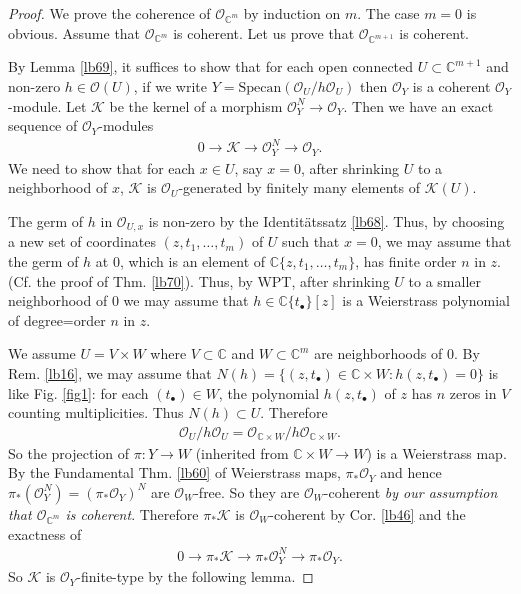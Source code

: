 \documentclass[12pt,b5paper,notitlepage]{report}
\theoremstyle{definition}
\theoremstyle{plain}
\newcommand{\scr}{\mathscr}
\newcommand{\blt}{\bullet}
\newcommand{\Cbb}{\mathbb C}
\newcommand{\Specan}{\mathrm{Specan}}
\numberwithin{equation}{section}
\begin{document}
\begin{proof}
We prove the coherence of $\scr O_{\Cbb^m}$ by induction on $m$. The case $m=0$ is obvious. Assume that $\scr O_{\Cbb^m}$ is coherent. Let us prove that $\scr O_{\Cbb^{m+1}}$ is coherent.

By Lemma \ref{lb69}, it suffices to show that for each open connected $U\subset \Cbb^{m+1}$ and non-zero $h\in\scr O(U)$, if we write $Y=\Specan(\scr O_U/h\scr O_U)$ then $\scr O_Y$ is a coherent $\scr O_Y$-module. Let $\scr K$ be the kernel of a morphism $\scr O_Y^N\rightarrow\scr O_Y$. Then we have an exact sequence of $\scr O_Y$-modules
\begin{align*}
0\rightarrow\scr K\rightarrow\scr O_Y^N\rightarrow\scr O_Y.
\end{align*}
We need to show that for each $x\in U$, say $x=0$, after shrinking $U$ to a neighborhood of $x$, $\scr K$ is $\scr O_U$-generated by finitely many elements of $\scr K(U)$.

The germ of $h$ in $\scr O_{U,x}$ is non-zero by the Identit\"atssatz \ref{lb68}. Thus, by choosing a new set of coordinates $(z,t_1,\dots,t_m)$ of $U$ such that $x=0$, we may assume that the germ of $h$ at $0$, which is an element of $\Cbb\{z,t_1,\dots,t_m\}$, has finite order $n$ in $z$. (Cf. the proof of Thm. \ref{lb70}). Thus, by WPT, after shrinking $U$ to a smaller neighborhood of $0$ we may assume that $h\in\Cbb\{t_\blt\}[z]$ is a Weierstrass polynomial of degree=order $n$ in $z$.

We assume $U=V\times W$ where $V\subset\Cbb$ and $W\subset\Cbb^m$ are neighborhoods of $0$. By Rem. \ref{lb16}, we may assume that $N(h)=\{(z,t_\blt)\in\Cbb\times W:h(z,t_\blt)=0\}$ is like Fig. \ref{fig1}: for each $(t_\blt)\in W$, the polynomial $h(z,t_\blt)$ of $z$ has $n$ zeros in $V$ counting multiplicities. Thus $N(h)\subset U$. Therefore
\begin{align*}
\scr O_U/h\scr O_U=\scr O_{\Cbb\times W}/h\scr O_{\Cbb\times W}.
\end{align*}
So the projection of $\pi:Y\rightarrow W$ (inherited from $\Cbb\times W\rightarrow W$) is a Weierstrass map. By the Fundamental Thm. \ref{lb60} of Weierstrass maps, $\pi_*\scr O_Y$ and hence $\pi_*(\scr O_Y^N)=(\pi_*\scr O_Y)^N$ are $\scr O_W$-free. So they are $\scr O_W$-coherent \textit{by our assumption that $\scr O_{\Cbb^m}$ is coherent}.  Therefore $\pi_*\scr K$ is $\scr O_W$-coherent by Cor. \ref{lb46} and the exactness of
\begin{align*}
0\rightarrow\pi_*\scr K\rightarrow \pi_*\scr O_Y^N\rightarrow\pi_*\scr O_Y.
\end{align*}
So $\scr K$ is $\scr O_Y$-finite-type by the following lemma.
\end{proof}
\end{document}
